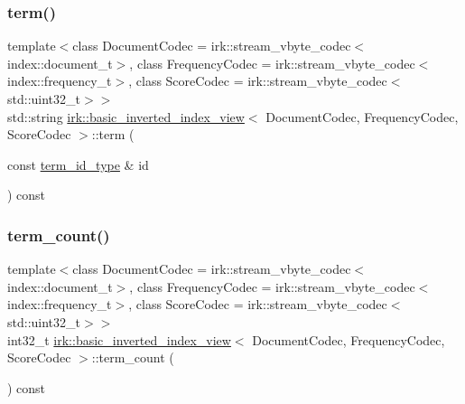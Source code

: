 \mbox{\label{classirk_1_1basic__inverted__index__view_a9d148686eeca4dc1f9fd1530834ef8f6}} 
\subsubsection{\texorpdfstring{term()}{term()}}
{\footnotesize\ttfamily template$<$class Document\+Codec  = irk\+::stream\+\_\+vbyte\+\_\+codec$<$index\+::document\+\_\+t$>$, class Frequency\+Codec  = irk\+::stream\+\_\+vbyte\+\_\+codec$<$index\+::frequency\+\_\+t$>$, class Score\+Codec  = irk\+::stream\+\_\+vbyte\+\_\+codec$<$std\+::uint32\+\_\+t$>$$>$ \\
std\+::string \mbox{\hyperlink{classirk_1_1basic__inverted__index__view}{irk\+::basic\+\_\+inverted\+\_\+index\+\_\+view}}$<$ Document\+Codec, Frequency\+Codec, Score\+Codec $>$\+::term (\begin{DoxyParamCaption}\item[{const \mbox{\hyperlink{classirk_1_1basic__inverted__index__view_a6b272abc76df208ce59bac93810e7331}{term\+\_\+id\+\_\+type}} \&}]{id }\end{DoxyParamCaption}) const\hspace{0.3cm}{\ttfamily [inline]}}

\mbox{\label{classirk_1_1basic__inverted__index__view_aef452bf73078178f01cc87db85d8886d}} 
\subsubsection{\texorpdfstring{term\+\_\+count()}{term\_count()}}
{\footnotesize\ttfamily template$<$class Document\+Codec  = irk\+::stream\+\_\+vbyte\+\_\+codec$<$index\+::document\+\_\+t$>$, class Frequency\+Codec  = irk\+::stream\+\_\+vbyte\+\_\+codec$<$index\+::frequency\+\_\+t$>$, class Score\+Codec  = irk\+::stream\+\_\+vbyte\+\_\+codec$<$std\+::uint32\+\_\+t$>$$>$ \\
int32\+\_\+t \mbox{\hyperlink{classirk_1_1basic__inverted__index__view}{irk\+::basic\+\_\+inverted\+\_\+index\+\_\+view}}$<$ Document\+Codec, Frequency\+Codec, Score\+Codec $>$\+::term\+\_\+count (\begin{DoxyParamCaption}{ }\end{DoxyParamCaption}) const\hspace{0.3cm}{\ttfamily [inline]}}

